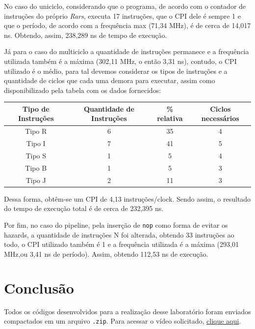 \documentclass[a4paper,12pt]{article}
\newcommand{\cod}[1]{\texttt{#1}}
\begin{document}
No caso do uniciclo, considerando que o programa, de acordo com o contador de instruções do próprio \textit{Rars}, executa 17 instruções, que o CPI dele é sempre 1 e que o período, de acordo com a frequência max (71,34 MHz), é de cerca de 14,017 ns. Obtendo, assim, 238,289 ns de tempo de execução.

Já para o caso do multiciclo a quantidade de instruções permanece e a frequência utilizada também é a máxima (302,11 MHz, o então 3,31 ns), contudo, o CPI utilizado é o médio, para tal devemos considerar os tipos de instruções e a quantidade de ciclos que cada uma demora para executar, assim como disponibilizado pela tabela com os dados fornecidos:

\begin{table}[H]
    \centering
\begin{tabular}{c|c|c|c}
    \hline
Tipo de Instruções & Quantidade de Instruções & \% relativa & Ciclos necessários \\ \hline
Tipo R             & 6                        & 35          & 4                  \\
Tipo I             & 7                        & 41          & 5                  \\
Tipo S             & 1                        & 5           & 4                  \\
Tipo B             & 1                        & 5           & 3                  \\
Tipo J             & 2                        & 11          & 3 
\end{tabular}
\end{table}

Dessa forma, obtêm-se um CPI de 4,13 instruções/clock. Sendo assim, o resultado do tempo de execução total é de cerca de 232,395 ns.

Por fim, no caso do pipeline, pela inserção de \cod{nop} como forma de evitar os hazards, a quantidade de instruções N foi alterada, obtendo 33 instruções ao todo, o CPI utilizado também é 1 e a frequência utilizada é a máxima (293,01 MHz,ou 3,41 ns de período). Assim, obtendo 112,53 ns de execução.


\section{Conclusão}

Todos os códigos desenvolvidos para a realização desse laboratório foram enviados compactados em um arquivo \cod{.zip}. Para acessar o vídeo solicitado, \href{https://www.youtube.com/watch?v=oISrELfP-Hw}{\textcolor{azul_link}{\underline{clique aqui}}}.
\end{document}

